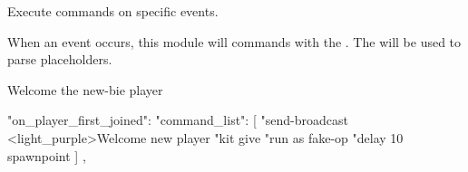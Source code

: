 \label{ch:command_event}

Execute commands on specific events.

When an event occurs, this module will  commands  with the .
The  will be used to parse placeholders.


\begin{example}{Welcome the new-bie player}
    \begin{jsoncode}
        "on_player_first_joined": {
            "command_list": [
            "send-broadcast <light_purple>Welcome new player %
            "kit give %
            "run as fake-op %
            "delay 10 spawnpoint %
            ]
        },
    \end{jsoncode}
\end{example}
